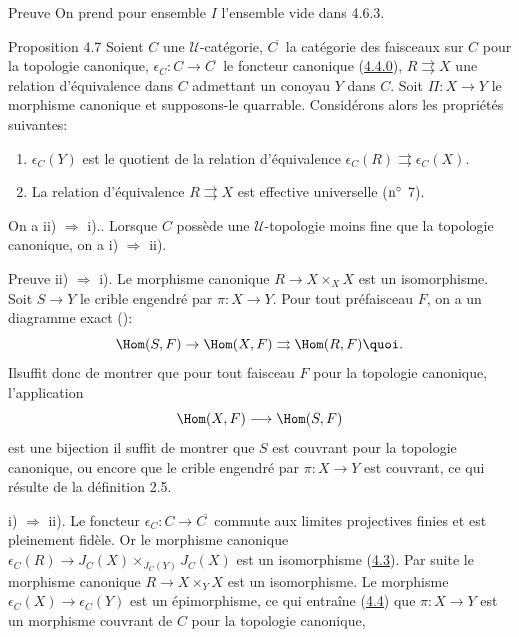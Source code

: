 \begin{enonce*}[remark]{Preuve}
On prend pour ensemble $I$ l'ensemble vide dans 4.6.3.
\end{enonce*}

\begin{enonce*}{Proposition 4.7}
Soient $C$ une $𝒰$-catégorie,
$C^{\widetilde{\phantom{,}}}$ la catégorie des faisceaux sur $C$
pour la topologie canonique, $\epsilon_C:C\rightarrow
C^{\widetilde{\phantom{,}}}$ le foncteur canonique
(\hyperref[II.subsubsec4.4.0]{4.4.0}), $R\rightrightarrows X$ une relation
d'équivalence dans $C$ admettant un conoyau $Y$ dans $C$. Soit
$\Pi:X\rightarrow Y$ le morphisme canonique et supposons-le
quarrable. Considérons alors les propriétés suivantes:
\begin{enumerate}
\renewcommand{\theenumi}{\roman{enumi}}
\renewcommand{\labelenumi}{\theenumi)}
\item $\epsilon_C(Y)$ est le quotient de la relation d'équivalence
  $\epsilon_C(R)\rightrightarrows \epsilon_C(X)$.

\item La relation d'équivalence $R\rightrightarrows X$ est effective
  universelle {\rm(\cf ${\rm n^{\circ}}$ 7).}
\end{enumerate}
On a {\rm{ii) $\Rightarrow$ i).}}. Lorsque $C$ possède une
$𝒰$-topologie moins fine que la topologie canonique, on a
{\rm{i) $\Rightarrow$ ii).}}
\end{enonce*}

\begin{enonce*}[remark]{Preuve}
ii) $\Rightarrow$ i). Le morphisme canonique $R\rightarrow X\times_X
X$ est un isomorphisme. Soit $S\rightarrow Y$ le crible engendré
par $\pi:X\rightarrow Y$. Pour tout préfaisceau $F$, on a un
diagramme exact ():
$$
\Hom(S,F)\rightarrow \Hom(X,F)\rightrightarrows \Hom(R,F){\quoi}.
$$
Il\pageoriginale suffit donc de montrer que pour tout faisceau $F$
pour la topologie canonique, l'application
$$
\Hom(X,F)\longrightarrow \Hom(S,F)
$$
est une bijection \ie il suffit de montrer que $S$ est couvrant pour
la topologie canonique, ou encore que le crible engendré par
$\pi:X\rightarrow Y$ est couvrant, ce qui résulte de la
définition 2.5.

\noindent i) $\Rightarrow$ ii). Le foncteur $\epsilon_C:C\rightarrow
C^{\widetilde{\phantom{,}}}$ commute aux limites projectives finies
et est pleinement fidèle. Or le morphisme canonique
$\epsilon_C(R)\rightarrow J_C(X)\times_{J_C(Y)}J_C(X)$ est un
isomorphisme (\hyperref[II.prop4.3]{4.3}). Par suite le morphisme canonique
$R\rightarrow X\times_Y X$ est un isomorphisme. Le morphisme
$\epsilon_C(X)\rightarrow \epsilon_C(Y)$ est un épimorphisme, ce
qui entraîne (\hyperref[II.theo4.4]{4.4}) que $\pi:X\rightarrow Y$ est un
morphisme couvrant de $C$ pour la topologie canonique, \cqfd
\end{enonce*}

